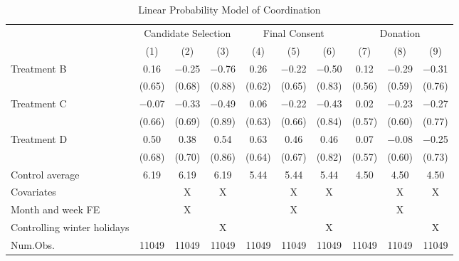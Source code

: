 \documentclass[12pt, a4paper]{article}
\begin{document}
\begin{table}[H]

\caption{\label{tab:coordinate-reg}Linear Probability Model of Coordination}
\centering
\fontsize{8}{10}\selectfont
\begin{threeparttable}
\begin{tabular}[t]{lccccccccc}
\toprule
\multicolumn{1}{c}{ } & \multicolumn{3}{c}{Candidate Selection} & \multicolumn{3}{c}{Final Consent} & \multicolumn{3}{c}{Donation} \\
\cmidrule(l{3pt}r{3pt}){2-4} \cmidrule(l{3pt}r{3pt}){5-7} \cmidrule(l{3pt}r{3pt}){8-10}
  & (1) & (2) & (3) & (4) & (5) & (6) & (7) & (8) & (9)\\
\midrule
Treatment B & \num{0.16} & \num{-0.25} & \num{-0.76} & \num{0.26} & \num{-0.22} & \num{-0.50} & \num{0.12} & \num{-0.29} & \num{-0.31}\\
 & (\num{0.65}) & (\num{0.68}) & (\num{0.88}) & (\num{0.62}) & (\num{0.65}) & (\num{0.83}) & (\num{0.56}) & (\num{0.59}) & (\num{0.76})\\
Treatment C & \num{-0.07} & \num{-0.33} & \num{-0.49} & \num{0.06} & \num{-0.22} & \num{-0.43} & \num{0.02} & \num{-0.23} & \num{-0.27}\\
 & (\num{0.66}) & (\num{0.69}) & (\num{0.89}) & (\num{0.63}) & (\num{0.66}) & (\num{0.84}) & (\num{0.57}) & (\num{0.60}) & (\num{0.77})\\
Treatment D & \num{0.50} & \num{0.38} & \num{0.54} & \num{0.63} & \num{0.46} & \num{0.46} & \num{0.07} & \num{-0.08} & \num{-0.25}\\
 & (\num{0.68}) & (\num{0.70}) & (\num{0.86}) & (\num{0.64}) & (\num{0.67}) & (\num{0.82}) & (\num{0.57}) & (\num{0.60}) & (\num{0.73})\\
\midrule
Control average & 6.19 & 6.19 & 6.19 & 5.44 & 5.44 & 5.44 & 4.50 & 4.50 & 4.50\\
Covariates &  & X & X &  & X & X &  & X & X\\
Month and week FE &  & X &  &  & X &  &  & X & \\
Controlling winter holidays &  &  & X &  &  & X &  &  & X\\
Num.Obs. & \num{11049} & \num{11049} & \num{11049} & \num{11049} & \num{11049} & \num{11049} & \num{11049} & \num{11049} & \num{11049}\\
\bottomrule
\end{tabular}
\begin{tablenotes}

\end{tablenotes}
\end{threeparttable}
\end{table}
\end{document}
